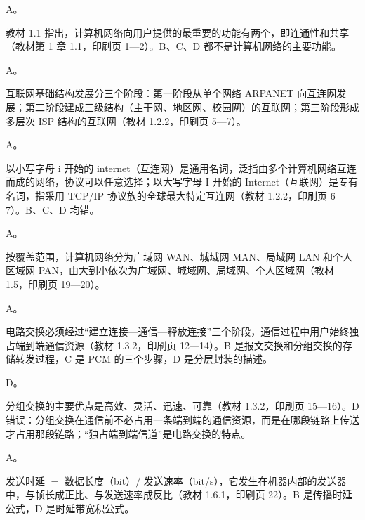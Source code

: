 \documentclass[a4paper,11pt]{article}
\begin{document}


\q A。\begin{analysis}教材 1.1 指出，计算机网络向用户提供的最重要的功能有两个，即连通性和共享（教材第 1 章 1.1，印刷页 1—2）。B、C、D 都不是计算机网络的主要功能。\end{analysis}

\q A。\begin{analysis}互联网基础结构发展分三个阶段：第一阶段从单个网络 ARPANET 向互连网发展；第二阶段建成三级结构（主干网、地区网、校园网）的互联网；第三阶段形成多层次 ISP 结构的互联网（教材 1.2.2，印刷页 5—7）。\end{analysis}

\q A。\begin{analysis}以小写字母 i 开始的 internet（互连网）是通用名词，泛指由多个计算机网络互连而成的网络，协议可以任意选择；以大写字母 I 开始的 Internet（互联网）是专有名词，指采用 TCP/IP 协议族的全球最大特定互连网（教材 1.2.2，印刷页 6—7）。B、C、D 均错。\end{analysis}

\q A。\begin{analysis}按覆盖范围，计算机网络分为广域网 WAN、城域网 MAN、局域网 LAN 和个人区域网 PAN，由大到小依次为广域网、城域网、局域网、个人区域网（教材 1.5，印刷页 19—20）。\end{analysis}

\q A。\begin{analysis}电路交换必须经过“建立连接—通信—释放连接”三个阶段，通信过程中用户始终独占端到端通信资源（教材 1.3.2，印刷页 12—14）。B 是报文交换和分组交换的存储转发过程，C 是 PCM 的三个步骤，D 是分层封装的描述。\end{analysis}

\q D。\begin{analysis}分组交换的主要优点是高效、灵活、迅速、可靠（教材 1.3.2，印刷页 15—16）。D 错误：分组交换在通信前不必占用一条端到端的通信资源，而是在哪段链路上传送才占用那段链路；“独占端到端信道”是电路交换的特点。\end{analysis}

\q A。\begin{analysis}发送时延 $=$ 数据长度（bit）$/$ 发送速率（bit/s），它发生在机器内部的发送器中，与帧长成正比、与发送速率成反比（教材 1.6.1，印刷页 22）。B 是传播时延公式，D 是时延带宽积公式。\end{analysis}
\end{document}
